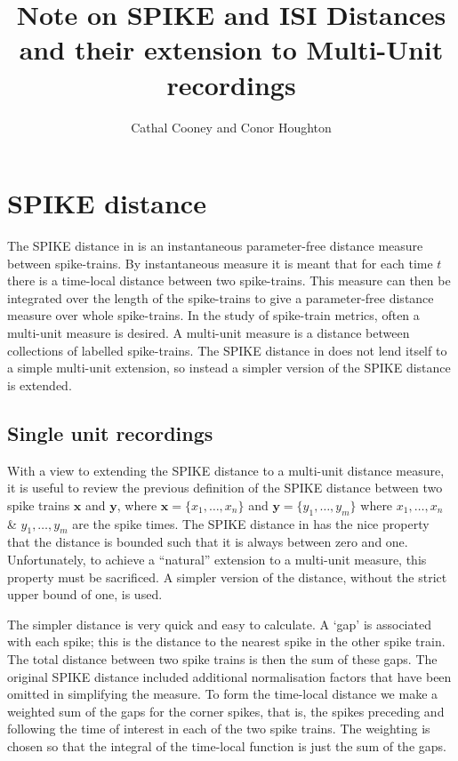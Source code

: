 \documentclass[12pt]{amsart}
\title{Note on SPIKE and ISI Distances and their extension to Multi-Unit recordings}
\author{Cathal Cooney and Conor Houghton}
\begin{document}
\maketitle
\section{SPIKE distance}

The SPIKE distance in \cite{Kreuzetal2007} is an instantaneous parameter-free distance measure between spike-trains.  By instantaneous measure it is meant that for each time $t$ there is a time-local distance between two spike-trains.  This measure can then be integrated over the length of the spike-trains to give a parameter-free distance measure over whole spike-trains.  In the study of spike-train metrics, often a multi-unit measure is desired.  A multi-unit measure is a distance between collections of labelled spike-trains.  The SPIKE distance in \cite{Kreuzetal2007} does not lend itself to a simple multi-unit extension, so instead a simpler version of the SPIKE distance is extended.

\subsection{Single unit recordings}


With a view to extending the SPIKE distance to a multi-unit distance measure, it is useful to review the previous definition of the SPIKE distance between two spike trains $\mathbf{x}$ and $\mathbf{y}$, where $\mathbf{x} = \{ x_1, \ldots , x_n \}$ and $\mathbf{y} = \{ y_1, \ldots , y_m \}$  where $x_1,\ldots,x_n$ \& $y_1,\ldots,y_m$ are the spike times. The SPIKE distance in \cite{Kreuzetal2007} has the nice property that the distance is bounded such that it is always between zero and one.  Unfortunately, to achieve a ``natural'' extension to a multi-unit measure, this property must be sacrificed.  A simpler version of the distance, without the strict upper bound of one, is used.

The simpler distance is very quick and easy to calculate.  A \lq{}gap\rq{} is associated with each spike; this is the distance to the nearest spike in the other spike train. The total distance between two spike trains is then the sum of these gaps. The original SPIKE distance included additional normalisation factors that have been omitted in simplifying the measure. To form the time-local distance we make a weighted sum of the gaps for the corner spikes, that is, the spikes preceding and following the time of interest in each of the two spike trains. The weighting is chosen so that the integral of the time-local function is just the sum of the gaps.
\end{document}
